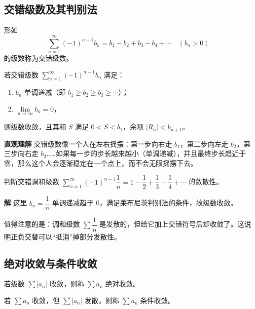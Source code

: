 \documentclass{ctexart}
\newenvironment{custom}[1]{\par\noindent \textbf{#1}\quad}{\par\vspace{1em}}
\begin{document}
\begin{example}[加减结构中的错误示例]
\subsection{交错级数及其判别法}

\begin{definition}[交错级数]
形如
\[
\sum_{n=1}^{\infty} (-1)^{n-1} b_n = b_1 - b_2 + b_3 - b_4 + \cdots \quad (b_n > 0)
\]
的级数称为交错级数。
\end{definition}

\begin{theorem}[莱布尼茨判别法]
若交错级数 \(\sum_{n=1}^{\infty} (-1)^{n-1} b_n\) 满足：
\begin{enumerate}
\item \(b_n\) 单调递减（即 \(b_1 \geq b_2 \geq b_3 \geq \cdots\)）；
\item \(\lim\limits_{n\to\infty} b_n = 0\)，
\end{enumerate}
则级数收敛，且其和 \(S\) 满足 \(0 < S < b_1\)，余项 \(|R_n| < b_{n+1}\)。
\end{theorem}

\begin{custom}{直观理解}
交错级数像一个人在左右摇摆：第一步向右走 \(b_1\)，第二步向左走 \(b_2\)，第三步向右走 \(b_3\)……如果每一步的步长越来越小（单调递减），并且最终步长趋近于零，那么这个人会逐渐稳定在一个点上，而不会无限摇摆下去。
\end{custom}

\begin{example}
判断交错调和级数 \(\sum_{n=1}^{\infty} (-1)^{n-1} \dfrac{1}{n} = 1 - \dfrac12 + \dfrac13 - \dfrac14 + \cdots\) 的敛散性。
\end{example}
\begin{custom}{解}
这里 \(b_n = \dfrac{1}{n}\) 单调递减趋于 0，满足莱布尼茨判别法的条件，故级数收敛。

值得注意的是：调和级数 \(\sum \dfrac{1}{n}\) 是发散的，但给它加上交错符号后却收敛了。这说明正负交替可以“抵消”掉部分发散性。
\end{custom}

\subsection{绝对收敛与条件收敛}

\begin{definition}[绝对收敛]
若级数 \(\sum |a_n|\) 收敛，则称 \(\sum a_n\) 绝对收敛。
\end{definition}

\begin{definition}[条件收敛]
若 \(\sum a_n\) 收敛，但 \(\sum |a_n|\) 发散，则称 \(\sum a_n\) 条件收敛。
\end{definition}


\end{example}
\end{document}
